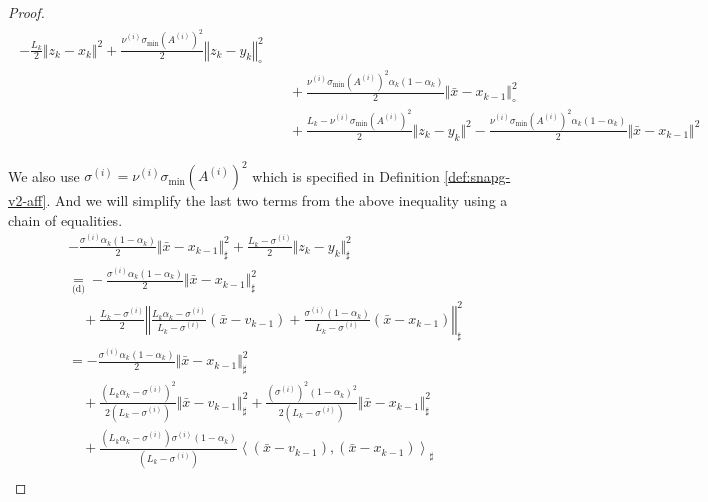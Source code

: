 \documentclass[12pt]{article}
\begin{document}
\begin{proof}
\begin{align}
\begin{split}
                - \frac{L_k}{2}\Vert z_k - x_k\Vert^2 
                + \frac{\nu^{(i)}\sigma_{\min}(A^{(i)})^2}{2}\left\Vert z_k - y_k\right\Vert^2_\circ
                    \\&\quad 
                    + \frac{\nu^{(i)}\sigma_{\min}(A^{(i)})^2\alpha_k(1 - \alpha_k)}{2}\Vert \bar x - x_{k - 1}\Vert^2_\circ
                    \\&\quad
                    + \frac{L_k - \nu^{(i)}\sigma_{\min}(A^{(i)})^2}{2}\Vert z_k - y_k\Vert^2
                    - \frac{\nu^{(i)}\sigma_{\min}(A^{(i)})^2\alpha_k(1 - \alpha_k)}{2}\Vert \bar x - x_{k - 1}\Vert^2
            \end{split}
        \end{align}

        We also use $\sigma^{(i)} = \nu^{(i)}\sigma_{\min}(A^{(i)})^2$ which is specified in Definition \ref{def:snapg-v2-aff}. 
        And we will simplify the last two terms from the above inequality using a chain of equalities. 
        {\allowdisplaybreaks
        \begin{align*}
            & - \frac{\sigma^{(i)}\alpha_k(1 - \alpha_k)}{2}\Vert \bar x - x_{k - 1}\Vert^2_\sharp
            + \frac{L_k - \sigma^{(i)}}{2}\Vert z_k - y_k\Vert^2_\sharp
            \\
            &\underset{\text{(d)}}{=}
            - \frac{\sigma^{(i)}\alpha_k(1 - \alpha_k)}{2}\Vert \bar x - x_{k - 1}\Vert^2_\sharp
                \\&\quad
                + \frac{L_k - \sigma^{(i)}}{2}
                \left\Vert
                    \frac{L_k\alpha_k - \sigma^{(i)}}{L_k - \sigma^{(i)}}(\bar x - v_{k - 1})
                    + \frac{\sigma^{(i)}(1 - \alpha_k)}{L_k - \sigma^{(i)}}(\bar x - x_{k - 1})
                \right\Vert^2_\sharp
            \\
            &= 
            - \frac{\sigma^{(i)}\alpha_k(1 - \alpha_k)}{2}\Vert \bar x - x_{k - 1}\Vert^2_\sharp 
                \\&\quad
                + \frac{(L_k\alpha_k - \sigma^{(i)})^2}{2(L_k - \sigma^{(i)})} \Vert \bar x - v_{k - 1}\Vert^2_\sharp
                + \frac{(\sigma^{(i)})^2(1 - \alpha_k)^2}{2(L_k - \sigma^{(i)})}\Vert \bar x - x_{k - 1}\Vert^2_\sharp 
                \\&\quad 
                + \frac{(L_k\alpha_k  - \sigma^{(i)})\sigma^{(i)}(1 - \alpha_k)}{(L_k - \sigma^{(i)})}\left\langle (\bar x - v_{k - 1}),(\bar x - x_{k - 1})\right\rangle_\sharp
            \\

\end{align*}}
\end{proof}
\end{document}
